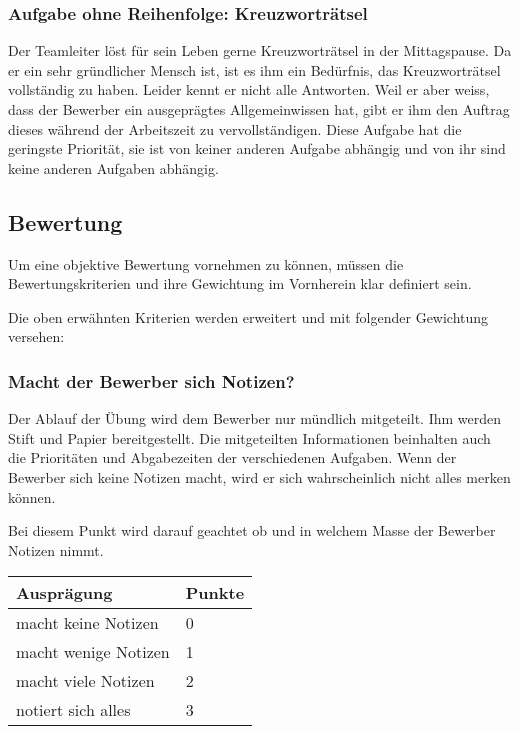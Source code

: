 \subsubsection{Aufgabe ohne Reihenfolge: Kreuzworträtsel}
Der Teamleiter löst für sein Leben gerne Kreuzworträtsel in der Mittagspause. Da er ein sehr gründlicher Mensch ist, ist es ihm ein Bedürfnis, das Kreuzworträtsel vollständig zu haben. Leider kennt er nicht alle Antworten. Weil er aber weiss, dass der Bewerber ein ausgeprägtes Allgemeinwissen hat, gibt er ihm den Auftrag dieses während der Arbeitszeit zu vervollständigen. Diese Aufgabe hat die geringste Priorität, sie ist von keiner anderen Aufgabe abhängig und von ihr sind keine anderen Aufgaben abhängig.

\subsection{Bewertung}

Um eine objektive Bewertung vornehmen zu können, müssen die Bewertungskriterien und ihre Gewichtung im Vornherein klar definiert sein.

Die oben erwähnten Kriterien werden erweitert und mit folgender Gewichtung versehen:


\subsubsection{Macht der Bewerber sich Notizen?}
Der Ablauf der Übung wird dem Bewerber nur mündlich mitgeteilt. Ihm werden Stift und Papier bereitgestellt. Die mitgeteilten Informationen beinhalten auch die Prioritäten und Abgabezeiten der verschiedenen Aufgaben. Wenn der Bewerber sich keine Notizen macht, wird er sich wahrscheinlich nicht alles merken können. 

Bei diesem Punkt wird darauf geachtet ob und in welchem Masse der Bewerber Notizen nimmt.

\begin{center}
  \begin{tabular}{ | p{5cm} | p{1cm} |}
   \hline
   \textbf{Ausprägung} & \textbf{Punkte} \\ \hline
   macht keine Notizen & 0 \\ \hline
   macht wenige Notizen & 1 \\ \hline
   macht viele Notizen & 2 \\ \hline
   notiert sich alles  & 3\\ \hline
  \end{tabular}
\end{center}


